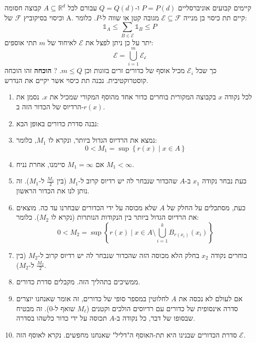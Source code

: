 \documentclass{tstextbook}
\begin{document}
\begin{theorem}
קיימים קבועים אוניברסליים \(P=P(d)\) ו-\(Q=Q(d)\) עבורם לכל \(A\subseteq \mathbb{R}^{d}\) קבוצה חסומה וכיסוי בסיקוביץ \(\mathcal{F}\) של A. קיים תת כיסוי בן מנייה \(\mathcal{E}\subseteq \mathcal{F}\) מגובה קטן או שווה ל-\(P\). כלומר:
$$\mathbb{1} _{A}\leq \sum_{B \in \mathcal{E} }\mathbb{1} _{B}\leq P$$
יתר על כן ניתן לפצל את \(\mathcal{E}\) לאיחוד של \(m\) תתי אוספים:
$$\mathcal{E} =\bigcup_{i=1}^{m}\mathcal{E_{i}} $$
כך שכל \(\mathcal{E}_{i}\) מכיל אוסף של כדורים זרים בזוגות וכן \(m\leq Q\).
?
\textbf{הוכחה}
זהו הוכחה קוסטרוקטיבית. נבנה תת כיסוי אשר יקיים את הנדרש.

  \begin{enumerate}
    \item לכל נקודה \(x\) בקבוצה המקורית בוחרים כדור אחד מהוסף המקורי שמכיל את \(x\). נסמן את הרדיוס של הכדור הזה ב-\(r(x)\). 


    \item נבנה סדרת כדורים באופן הבא: 


    \item נמצא את הרדיוס הגדול ביותר, ונקרא לו \(M_{1}\), כלומר:
$$0<M_{1}=\sup \left\{  r(x)\mid x \in A  \right\}$$
    \item אם \(M_{1}=\infty\) סיימנו, אחרת נניח \(M_{1}< \infty\). 
    \item כעת נבחר נקודה \(x_1\) ב-\(A\) שהכדור שנבחר לה יש רדיוס קרוב ל-\(M_1\) (בין \(\frac{M_1}{2}\) ל-\(M_1\)). זה נותן לנו את הכדור הראשון.
    \item כעת, מסתכלים על החלק של \(A\) שלא מכוסה על ידי הכדורים שבחרנו עד כה. מוצאים את הרדיוס הגדול ביותר בין הנקודות הנותרות (נקרא לו \(M_2\)). כלומר:
$$0<M_{2}=\sup \left\{  r(x)\mid x \in A \setminus  \bigcup_{i=1}^{k} B_{r(x_{i})}(x_{i})  \right\}$$
    \item בוחרים נקודה \(x_2\) בחלק הלא מכוסה הזה שהכדור שנבחר לה יש רדיוס קרוב ל-\(M_2\) (בין \(\frac{M_2}{2}\) ל-\(M_2\)).
    \item ממשיכים בתהליך הזה. מקבלים סדרת כדורים.


    \item אם לעולם לא נכסה את \(A\) לחלוטין במספר סופי של כדורים, זה אומר שאנחנו יוצרים סדרה אינסופית של כדורים עם רדיוסים הולכים וקטנים (\(M_\ell\) שואף ל-0). זה מבטיח שבסופו של דבר, כל נקודה ב-\(A\) תכוסה על ידי כדור כלשהו בסדרה. 


    \item סדרת הכדורים שבנינו היא תת-האוסף ה"דליל" שאנחנו מחפשים. נקרא לאוסף הזה \(\mathcal{E}\). 



\end{enumerate}
\end{theorem}
\end{document}
